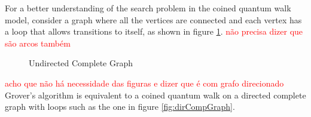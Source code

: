                 For a better understanding of the search problem in the coined quantum walk model, consider a graph where all the vertices are connected and each vertex has a loop that allows transitions to itself, as shown in figure \ref{fig:undCompGraph}. \textcolor{red}{não precisa dizer que são arcos também}
                \begin{figure}[!h]
                \centering
                  \caption{Undirected Complete Graph}
                  \label{fig:undCompGraph}
                \end{figure}
                \textcolor{red}{acho que não há necessidade das figuras e dizer que é com grafo direcionado}
                Grover's algorithm is equivalent to a coined quantum walk on a directed complete graph with loops such as the one in figure \ref{fig:dirCompGraph}.
